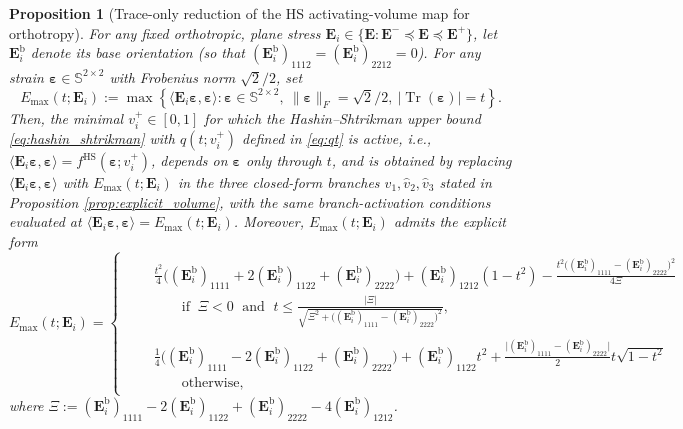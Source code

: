 \documentclass[preprint,3p]{elsarticle}
\newcommand{\tenss}[1]{\bm{\mathbf{#1}}}            %
\newcommand{\tensf}[1]{\bm{\mathbf{#1}}}            %
\newcommand{\strain}{\tenss{\varepsilon}}           %
\newcommand{\Ei}{\tensf{E}_i}                       %
\newcommand{\Emin}{\tensf{E}^{-}}                   %
\newcommand{\Emax}{\tensf{E}^{+}}                   %
\newcommand{\Tr}{\operatorname{Tr}}
\newtheorem{proposition}{Proposition}[section]
\begin{document}
\begin{proposition}[Trace-only reduction of the HS activating-volume map for orthotropy]\label{prop:trace_only_reduction}
    For any fixed orthotropic, plane stress $\Ei \in \{\tensf{E}: \Emin \preceq \tensf{E} \preceq \Emax\}$, let $\Ei^{\mathrm{b}}$ denote its base orientation (so that $(\Ei^{\mathrm{b}})_{1112}=(\Ei^{\mathrm{b}})_{2212}=0$). For any strain $\strain\in\mathbb{S}^{2\times2}$ with Frobenius norm $\sqrt{2}/2$, set
    $$
        E_{\max}(t;\Ei) := \max\left\{\langle \Ei\strain,\strain\rangle: \strain\in\mathbb{S}^{2\times2},\ \lVert\strain\rVert_F=\sqrt{2}/2,\ \lvert\Tr(\strain)\rvert = t\right\}.
    $$
    Then, the minimal $v_i^+\in[0,1]$ for which the Hashin--Shtrikman upper bound \eqref{eq:hashin_shtrikman} with $q(t;v_i^+)$ defined in \eqref{eq:qt} is active, i.e., $\langle \Ei\strain,\strain\rangle = f^{\mathrm{HS}}(\strain;v_i^+)$, depends on $\strain$ only through $t$, and is obtained by replacing $\langle \Ei\strain,\strain\rangle$ with $E_{\max}(t;\Ei)$ in the three closed-form branches $\hat{v}_1,\hat{v}_2,\hat{v}_3$ stated in Proposition \ref{prop:explicit_volume}, with the same branch-activation conditions evaluated at $\langle \Ei\strain,\strain\rangle=E_{\max}(t;\Ei)$. Moreover, $E_{\max}(t;\Ei)$ admits the explicit form
    \begin{equation}\label{eq:excplicitenergybranches}
    E_{\max}(t;\Ei)=
    \begin{cases}
    & \begin{aligned}
        &\frac{t^2}{4} \big((\Ei^{\mathrm{b}})_{1111}+2(\Ei^{\mathrm{b}})_{1122}+(\Ei^{\mathrm{b}})_{2222}\big) + (\Ei^{\mathrm{b}})_{1212}(1-t^2)
        - \frac{t^2 \big((\Ei^{\mathrm{b}})_{1111}-(\Ei^{\mathrm{b}})_{2222}\big)^2}{4 \Xi}\\
        &\qquad\text{if }\ \Xi<0 \;\text{ and }\; t\le\frac{\lvert \Xi \rvert}{\sqrt{\Xi^2 + \big((\Ei^{\mathrm{b}})_{1111}-(\Ei^{\mathrm{b}})_{2222}\big)^2}},
    \end{aligned}\\
    & \begin{aligned}
        &\frac{1}{4}\big((\Ei^{\mathrm{b}})_{1111}-2 (\Ei^{\mathrm{b}})_{1122}+(\Ei^{\mathrm{b}})_{2222}\big)
        + (\Ei^{\mathrm{b}})_{1122} t^2
        + \frac{\big\lvert (\Ei^{\mathrm{b}})_{1111}-(\Ei^{\mathrm{b}})_{2222}\big\rvert}{2} t \sqrt{1-t^2}\\
        &\qquad\text{otherwise},
    \end{aligned}
    \end{cases}
    \end{equation}
    where $\Xi:=(\Ei^{\mathrm{b}})_{1111}-2(\Ei^{\mathrm{b}})_{1122}+(\Ei^{\mathrm{b}})_{2222}-4(\Ei^{\mathrm{b}})_{1212}$.
\end{proposition}
\end{document}
